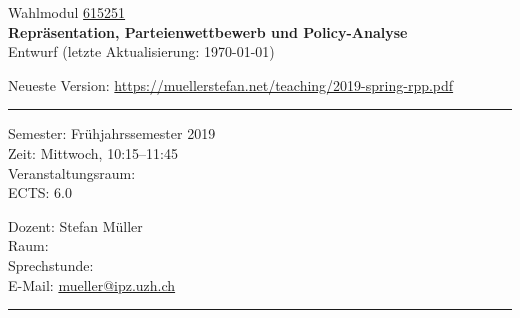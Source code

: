 \documentclass[abstract=on,parskip=full,headings=standardclasses,fontsize=11pt,paper=a4]{scrartcl}
\begin{document}
	
\singlespacing

\noindent
{}%
\hfill%

\singlespacing
\vspace{1cm}

\begin{center}
{\large Wahlmodul \href{https://studentservices.uzh.ch/uzh/anonym/vvz/index.html#/details/2018/004/E/50926420}{615251}} \\ 
\medskip
{\Large \textbf{Repräsentation, Parteienwettbewerb und Policy-Analyse}} \\
\bigskip
{\large  Entwurf (letzte Aktualisierung: \today)}

Neueste Version: \url{https://muellerstefan.net/teaching/2019-spring-rpp.pdf}
\end{center}

\vspace{1.5cm}

\hrule
\medskip
\begin{minipage}[t]{0.5\textwidth}
Semester: Frühjahrssemester 2019 \\
Zeit: Mittwoch, 10:15--11:45 \\
Veranstaltungsraum: \\
ECTS: 6.0
\end{minipage}
\begin{minipage}[t]{0.5\textwidth}
\begin{flushright}
Dozent: Stefan Müller \\
Raum: \\
Sprechstunde: \\
E-Mail: \textsf{\href{mailto:mueller@ipz.uzh.ch}{mueller@ipz.uzh.ch}}
\end{flushright}
\end{minipage}
\medskip
\vspace{2.5mm}
\hrule 
\end{document}
